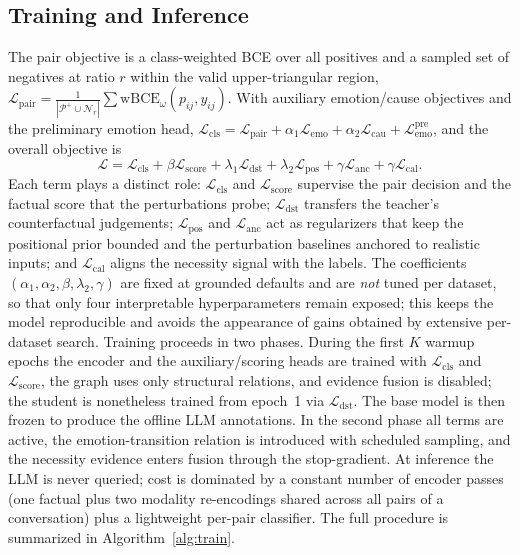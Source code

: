 \documentclass[journal]{IEEEtran}
\begin{document}
\subsection{Training and Inference}
\label{sec:training}
The pair objective is a class-weighted BCE over all positives and a sampled set of negatives
at ratio $r$ within the valid upper-triangular region,
$\mathcal{L}_{\mathrm{pair}}=\frac{1}{|\mathcal{P}^{+}\cup\mathcal{N}_r|}\sum
\mathrm{wBCE}_{\omega}(p_{ij},y_{ij})$. With auxiliary emotion/cause objectives and the
preliminary emotion head,
$\mathcal{L}_{\mathrm{cls}}=\mathcal{L}_{\mathrm{pair}}+\alpha_1\mathcal{L}_{\mathrm{emo}}+\alpha_2\mathcal{L}_{\mathrm{cau}}+\mathcal{L}_{\mathrm{emo}}^{\mathrm{pre}}$,
and the overall objective is
\begin{equation}
\mathcal{L}=\mathcal{L}_{\mathrm{cls}}+\beta\mathcal{L}_{\mathrm{score}}+\lambda_1\mathcal{L}_{\mathrm{dst}}+\lambda_2\mathcal{L}_{\mathrm{pos}}+\gamma\mathcal{L}_{\mathrm{anc}}+\gamma\mathcal{L}_{\mathrm{cal}}.
\end{equation}
Each term plays a distinct role: $\mathcal{L}_{\mathrm{cls}}$ and
$\mathcal{L}_{\mathrm{score}}$ supervise the pair decision and the factual score that the
perturbations probe; $\mathcal{L}_{\mathrm{dst}}$ transfers the teacher's counterfactual
judgements; $\mathcal{L}_{\mathrm{pos}}$ and $\mathcal{L}_{\mathrm{anc}}$ act as regularizers
that keep the positional prior bounded and the perturbation baselines anchored to realistic
inputs; and $\mathcal{L}_{\mathrm{cal}}$ aligns the necessity signal with the labels. The
coefficients $(\alpha_1,\alpha_2,\beta,\lambda_2,\gamma)$ are fixed at grounded defaults and
are \emph{not} tuned per dataset, so that only four interpretable hyperparameters remain
exposed; this keeps the model reproducible and avoids the appearance of gains obtained by
extensive per-dataset search.
Training proceeds in two phases. During the first $K$ warmup epochs the encoder and the
auxiliary/scoring heads are trained with $\mathcal{L}_{\mathrm{cls}}$ and
$\mathcal{L}_{\mathrm{score}}$, the graph uses only structural relations, and evidence fusion
is disabled; the student is nonetheless trained from epoch~1 via $\mathcal{L}_{\mathrm{dst}}$.
The base model is then frozen to produce the offline LLM annotations. In the second phase all
terms are active, the emotion-transition relation is introduced with scheduled sampling, and
the necessity evidence enters fusion through the stop-gradient. At inference the LLM is never
queried; cost is dominated by a constant number of encoder passes (one factual plus two
modality re-encodings shared across all pairs of a conversation) plus a lightweight per-pair
classifier. The full procedure is summarized in Algorithm~\ref{alg:train}.
\end{document}
